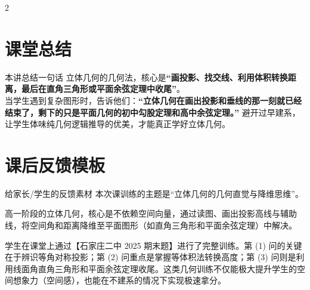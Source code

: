 \documentclass[11pt,a4paper]{ctexart}
\begin{document}
\par\vspace{1.0em}\par\vspace{1.0em}

{\small \qSolidIsoscelesTetrahedronStem}
\begin{center}
  \qSolidIsoscelesTetrahedronFigure[1.6]
\end{center}

\begin{paracol}{2}
\switchcolumn
{}
\end{paracol}

\section{课堂总结}

\begin{teachbox}{本讲总结一句话}
立体几何的几何法，核心是\textbf{“画投影、找交线、利用体积转换距离，最后在直角三角形或平面余弦定理中收尾”}。\\
当学生遇到复杂图形时，告诉他们：\textbf{“立体几何在画出投影和垂线的那一刻就已经结束了，剩下的只是平面几何的初中勾股定理和高中余弦定理。”} 避开过早建系，让学生体味纯几何逻辑推导的优美，才能真正学好立体几何。
\end{teachbox}

\section{课后反馈模板}

\begin{teachbox}{给家长/学生的反馈素材}
本次课训练的主题是“立体几何的几何直觉与降维思维”。\par
高一阶段的立体几何，核心是不依赖空间向量，通过读图、画出投影高线与辅助线，将空间角和距离降维至平面图形（如直角三角形和平面余弦定理）中解决。\par
学生在课堂上通过【石家庄二中 2025 期末题】进行了完整训练。第 (1) 问的关键在于辨识等角对称投影；第 (2) 问重点是掌握等体积法转换高度；第 (3) 问则是利用线面角直角三角形和平面余弦定理收尾。这类几何训练不仅能极大提升学生的空间想象力（空间感），也能在不建系的情况下实现极速拿分。
\end{teachbox}
\end{document}
